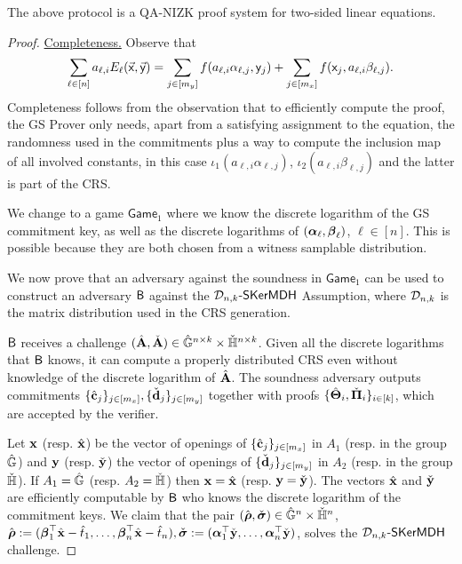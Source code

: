 \begin{theorem}
The above protocol is a QA-NIZK proof system for two-sided linear equations.
\end{theorem}  
\begin{proof} {\underline{Completeness.}}  Observe that
\begin{equation}
\sum_{\ell\in[n]} a_{\ell,i} E_{\ell}(\vec{\mathsf{x}},\vec{\mathsf{y}})= \sum_{j\in[m_y]} f( a_{\ell,i} \alpha_{\ell,j}, \mathsf{y}_j) + 
\sum_{j\in[m_x]}  f(\mathsf{x}_j, a_{\ell,i} \beta_{\ell,j}).
\end{equation}  Completeness follows 
from the observation that to efficiently compute the proof, the GS Prover \cite{ManualBib_SIAMJC:GroSah12} only needs, apart from a satisfying assignment to the equation, the randomness used in the commitments plus a way to compute the inclusion map of all involved constants, in this case $\iota_1(a_{\ell,i} \alpha_{\ell,j})$,
$\iota_2(a_{\ell,i} \beta_{\ell,j})$ and the latter is part of the CRS.
 
  We change to a game $\mathsf{Game}_{1}$ where we know the discrete logarithm of the GS commitment key, as well as the discrete logarithms of $({\boldsymbol \alpha}_{\ell},{\boldsymbol \beta}_{\ell})$, $\ell \in [n]$. This is possible because they are both chosen from a witness samplable distribution.

We now prove that an adversary against the soundness in $\mathsf{Game}_{1}$ can be used to construct an adversary $\mathsf{B}$ against the 
$\mathcal{D}_{n,k}\mbox{-}\mathsf{SKerMDH}$ Assumption, where 
$\mathcal{D}_{n,k}$ is the matrix distribution used in the CRS generation. 

$\mathsf{B}$ receives a challenge $({\hat{\mathbf{{A}}}},\check{\mathbf{{A}}})\in{\ensuremath{\hat{\mathbb{G}}}}^{n\times k}\times{\ensuremath{\check{\mathbb{H}}}}^{n\times k}$. Given all the discrete logarithms that $\mathsf{B}$ knows, it can compute a properly distributed CRS even without knowledge of the discrete logarithm of ${\hat{\mathbf{{A}}}}$. The  soundness adversary outputs commitments $\{{\hat{\mathbf{c}}}_j\}_{j\in[m_x]},\{\check{\mathbf{d}}_{j}\}_{j\in[m_y]}$ together with proofs $\{{\hat{\mathbf{{\Theta}}}}_{i},\check{\mathbf{{\Pi}}}_{i}\}_{i \in [k]}$, which are accepted by the verifier. 
 
Let $\mathbf{x}$ (resp. $\hat{\mathbf{x}}$) be the vector of openings of $\{{\hat{\mathbf{c}}}_j\}_{j\in[m_x]}$ in $A_1$ (resp. in the group ${\hat{\mathbb{G}}}$)  and $\mathbf{y}$  (resp. $\check{\mathbf{y}}$) the vector of openings of $\{\check{\mathbf{d}}_j\}_{j\in[m_y]}$ in $A_2$ (resp. in the group ${\check{\mathbb{H}}}$). If $A_1={\hat{\mathbb{G}}}$  (resp. $A_2={\check{\mathbb{H}}}$) then $\mathbf{x}=\hat{\mathbf{x}}$  (resp. $\mathbf{y}=\check{\mathbf{y}}$). The vectors $\hat{\mathbf{x}}$ and $\check{\mathbf{y}}$ are efficiently computable by $\mathsf{B}$ who knows the discrete logarithm of the commitment keys. We claim that the pair  $(\hat{{\boldsymbol \rho}},\check{{\boldsymbol \sigma}}) \in {\ensuremath{\hat{\mathbb{G}}}}^{n} \times {\ensuremath{\check{\mathbb{H}}}}^n$, 
$\hat{{\boldsymbol \rho}}:=({\boldsymbol \beta}_1^\top{\hat{\mathbf{x}}} -\hat{t}_{1},\ldots,
{\boldsymbol \beta}_{n}^\top{\hat{\mathbf{x}}} -\hat{t}_{n}),  
\check{{\boldsymbol \sigma}}:=({\boldsymbol \alpha}_1^\top\check{\mathbf{y}},\ldots,
{\boldsymbol \alpha}_{n}^\top\check{\mathbf{y}})$, solves the  $\mathcal{D}_{n,k}\mbox{-}\mathsf{SKerMDH}$ challenge. 


\end{proof}
